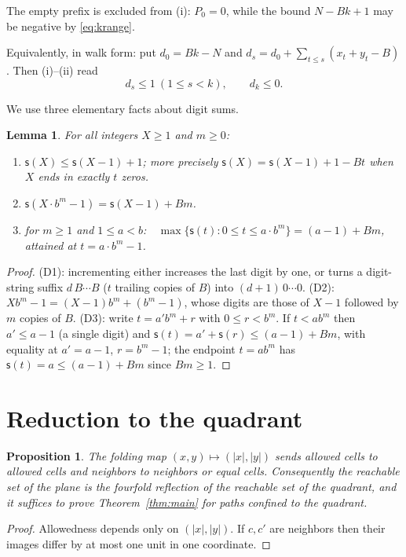 \documentclass[11pt]{article}
\newtheorem{lemma}[theorem]{Lemma}
\newtheorem{proposition}[theorem]{Proposition}
\theoremstyle{remark}
\newcommand{\ds}{\mathsf{s}}
\begin{document}
The empty prefix is excluded from (i): $P_0=0$, while the bound $N-Bk+1$ may be
negative by \eqref{eq:krange}.

Equivalently, in walk form: put $d_0=Bk-N$ and
$d_s=d_0+\sum_{t\le s}(x_t+y_t-B)$. Then (i)--(ii) read
\[
d_s\le 1\ (1\le s<k), \qquad d_k\le 0 .
\]

We use three elementary facts about digit sums.

\begin{lemma}\label{lem:digits}
For all integers $X\ge 1$ and $m\ge 0$:
\begin{enumerate}
\item[\textup{(D1)}] $\ds(X)\le \ds(X-1)+1$; more precisely
$\ds(X)=\ds(X-1)+1-Bt$ when $X$ ends in exactly $t$ zeros.
\item[\textup{(D2)}] $\ds(X\cdot b^m-1)=\ds(X-1)+Bm$.
\item[\textup{(D3)}] for $m\ge 1$ and $1\le a<b$:\ \
$\max\{\ds(t): 0\le t\le a\cdot b^m\}=(a-1)+Bm$, attained at $t=a\cdot b^m-1$.
\end{enumerate}
\end{lemma}

\begin{proof}
(D1): incrementing either increases the last digit by one, or turns a digit-string
suffix $d\,B\cdots B$ ($t$ trailing copies of $B$) into $(d{+}1)\,0\cdots 0$.
(D2): $X b^m-1=(X-1)b^m+(b^m-1)$, whose digits are those of $X-1$ followed by $m$
copies of $B$. (D3): write $t=a'b^m+r$ with $0\le r<b^m$. If $t<ab^m$ then
$a'\le a-1$ (a single digit) and $\ds(t)=a'+\ds(r)\le (a-1)+Bm$, with equality at
$a'=a-1$, $r=b^m-1$; the endpoint $t=ab^m$ has $\ds(t)=a\le(a-1)+Bm$ since
$Bm\ge1$.
\end{proof}

\section{Reduction to the quadrant}

\begin{proposition}\label{prop:fold}
The folding map $(x,y)\mapsto(|x|,|y|)$ sends allowed cells to allowed cells and
neighbors to neighbors or equal cells. Consequently the reachable set of the plane
is the fourfold reflection of the reachable set of the quadrant, and it suffices to
prove Theorem~\ref{thm:main} for paths confined to the quadrant.
\end{proposition}

\begin{proof}
Allowedness depends only on $(|x|,|y|)$. If $c,c'$ are neighbors then their images
differ by at most one unit in one coordinate.
\end{proof}
\end{document}
